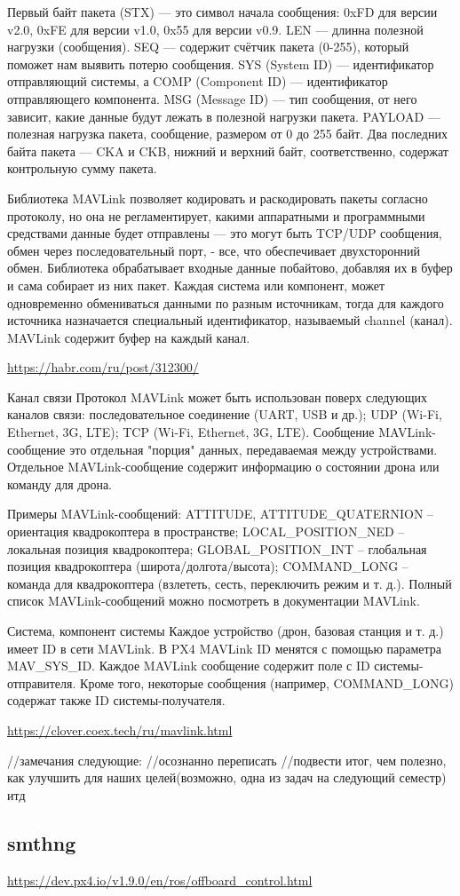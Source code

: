 Первый байт пакета (STX) — это символ начала сообщения: 0xFD для версии v2.0, 0xFE для версии v1.0, 0x55 для версии v0.9. LEN — длинна полезной нагрузки (сообщения). SEQ — содержит счётчик пакета (0-255), который поможет нам выявить потерю сообщения. SYS (System ID) — идентификатор отправляющий системы, а COMP (Component ID) — идентификатор отправляющего компонента. MSG (Message ID) — тип сообщения, от него зависит, какие данные будут лежать в полезной нагрузки пакета. PAYLOAD — полезная нагрузка пакета, сообщение, размером от 0 до 255 байт. Два последних байта пакета — CKA и CKB, нижний и верхний байт, соответственно, содержат контрольную сумму пакета.

Библиотека MAVLink позволяет кодировать и раскодировать пакеты согласно протоколу, но она не регламентирует, какими аппаратными и программными средствами данные будет отправлены — это могут быть TCP/UDP сообщения, обмен через последовательный порт, - все, что обеспечивает двухсторонний обмен. Библиотека обрабатывает входные данные побайтово, добавляя их в буфер и сама собирает из них пакет. Каждая система или компонент, может одновременно обмениваться данными по разным источникам, тогда для каждого источника назначается специальный идентификатор, называемый channel (канал). MAVLink содержит буфер на каждый канал.

\url{https://habr.com/ru/post/312300/}

Канал связи
Протокол MAVLink может быть использован поверх следующих каналов связи:
последовательное соединение (UART, USB и др.);
UDP (Wi-Fi, Ethernet, 3G, LTE);
TCP (Wi-Fi, Ethernet, 3G, LTE).
Сообщение
MAVLink-сообщение это отдельная "порция" данных, передаваемая между устройствами. Отдельное MAVLink-сообщение содержит информацию о состоянии дрона или команду для дрона.

Примеры MAVLink-сообщений:
ATTITUDE, ATTITUDE\_QUATERNION – ориентация квадрокоптера в пространстве;
LOCAL\_POSITION\_NED – локальная позиция квадрокоптера;
GLOBAL\_POSITION\_INT – глобальная позиция квадрокоптера (широта/долгота/высота);
COMMAND\_LONG – команда для квадрокоптера (взлететь, сесть, переключить режим и т. д.).
Полный список MAVLink-сообщений можно посмотреть в документации MAVLink.

Система, компонент системы
Каждое устройство (дрон, базовая станция и т. д.) имеет ID в сети MAVLink. В PX4 MAVLink ID менятся с помощью параметра MAV\_SYS\_ID. Каждое MAVLink сообщение содержит поле с ID системы-отправителя. Кроме того, некоторые сообщения (например, COMMAND\_LONG) содержат также ID системы-получателя.

\url{https://clover.coex.tech/ru/mavlink.html}

//замечания следующие:
//осознанно переписать
//подвести итог, чем полезно, как улучшить для наших целей(возможно, одна из задач на следующий семестр) итд

\subsection{smthng}

\url{https://dev.px4.io/v1.9.0/en/ros/offboard_control.html}
